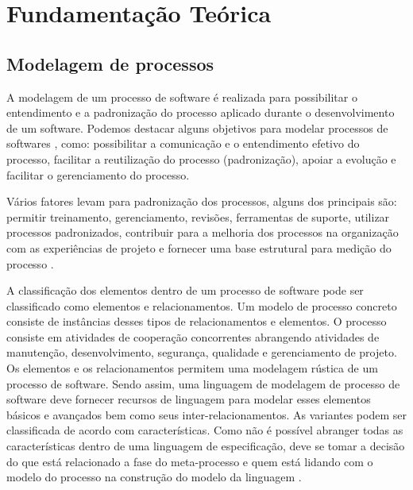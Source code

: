 \section{Fundamentação Teórica}\label{fundamentacaoTeorica}

\subsection{Modelagem de processos}
A modelagem de um processo de software é realizada para possibilitar o entendimento e a padronização do processo aplicado durante o desenvolvimento de um software. Podemos destacar alguns objetivos para modelar processos de softwares \cite{genvigir2003modelagem}, como: possibilitar a comunicação e o entendimento efetivo do processo, facilitar a reutilização do processo (padronização), apoiar a evolução e facilitar o gerenciamento do processo.


Vários fatores levam para padronização dos processos, alguns dos principais são: permitir treinamento, gerenciamento, revisões, ferramentas de suporte, utilizar processos padronizados, contribuir para a melhoria dos processos na organização com as experiências de projeto e fornecer uma base estrutural para medição do processo \cite{genvigir2003modelagem}.


A classificação dos elementos dentro de um processo de software pode ser classificado como elementos e relacionamentos. Um modelo de processo concreto consiste de instâncias desses tipos de relacionamentos e elementos. O processo consiste em atividades de cooperação concorrentes abrangendo atividades de manutenção, desenvolvimento, segurança, qualidade e gerenciamento de projeto. Os elementos e os relacionamentos permitem uma modelagem rústica de um processo de software. Sendo assim, uma linguagem de modelagem de processo de software deve fornecer recursos de linguagem para modelar esses elementos básicos e avançados bem como seus inter-relacionamentos. As variantes podem ser classificada de acordo com características. Como não é possível abranger todas as características dentro de uma linguagem de especificação, deve se tomar a decisão do que está relacionado a fase do meta-processo e quem está lidando com o modelo do processo na construção do modelo da linguagem \cite{genvigir2003modelagem}.


